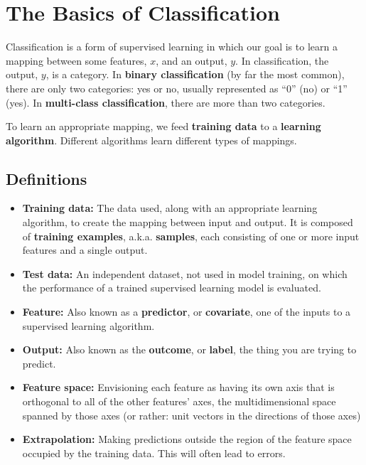 \chapter{The Basics of Classification \label{chapter:classification}}

Classification is a form of supervised learning in which our goal is to learn a mapping between some features, $x$, and an output, $y$. In classification, the output, $y$, is a category. In \textbf{binary classification} (by far the most common), there are only two categories: yes or no, usually represented as ``0'' (no) or ``1'' (yes). In \textbf{multi-class classification}, there are more than two categories.

To learn an appropriate mapping, we feed \textbf{training data} to a \textbf{learning algorithm}. Different algorithms learn different types of mappings.

\section{Definitions}

\begin{itemize}
\item \textbf{Training data:} The data used, along with an appropriate learning algorithm, to create the mapping between input and output. It is composed of \textbf{training examples}, a.k.a. \textbf{samples}, each consisting of one or more input features and a single output.
\item \textbf{Test data:} An independent dataset, not used in model training, on which the performance of a trained supervised learning model is evaluated. 
\item \textbf{Feature:} Also known as a \textbf{predictor}, or \textbf{covariate}, one of the inputs to a supervised learning algorithm.
\item \textbf{Output:} Also known as the \textbf{outcome}, or \textbf{label}, the thing you are trying to predict.
\item \textbf{Feature space:} Envisioning each feature as having its own axis that is orthogonal to all of the other features' axes, the multidimensional space spanned by those axes (or rather: unit vectors in the directions of those axes)
\item \textbf{Extrapolation:} Making predictions outside the region of the feature space occupied by the training data. This will often lead to errors. 
\end{itemize}

